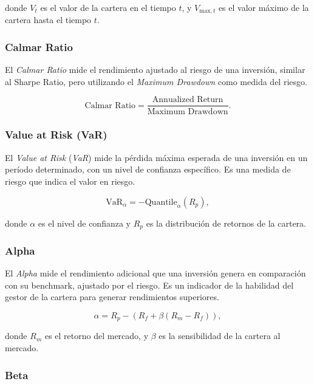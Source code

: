 \documentclass[a4paper,12pt, twoside]{report}
\begin{document}
donde $V_t$ es el valor de la cartera en el tiempo $t$, y $V_{\text{max}, t}$ es el valor máximo de la cartera hasta el tiempo $t$.

\subsubsection{Calmar Ratio}

El \textit{Calmar Ratio} mide el rendimiento ajustado al riesgo de una inversión, similar al Sharpe Ratio, pero utilizando el \textit{Maximum Drawdown} como medida del riesgo.

\begin{equation}
\text{Calmar Ratio} = \frac{\text{Annualized Return}}{\text{Maximum Drawdown}}.
\end{equation}

\subsubsection{Value at Risk (VaR)}

El \textit{Value at Risk} (\textit{VaR}) mide la pérdida máxima esperada de una inversión en un período determinado, con un nivel de confianza específico. Es una medida de riesgo que indica el valor en riesgo.

\begin{equation}
\text{VaR}_{\alpha} = -\text{Quantile}_\alpha (R_p),
\end{equation}

donde $\alpha$ es el nivel de confianza y $R_p$ es la distribución de retornos de la cartera.

\subsubsection{Alpha}

El \textit{Alpha} mide el rendimiento adicional que una inversión genera en comparación con su benchmark, ajustado por el riesgo. Es un indicador de la habilidad del gestor de la cartera para generar rendimientos superiores.

\begin{equation}
\alpha = R_p - \left(R_f + \beta (R_m - R_f)\right),
\end{equation}

donde $R_m$ es el retorno del mercado, y $\beta$ es la sensibilidad de la cartera al mercado.

\subsubsection{Beta}
\end{document}
